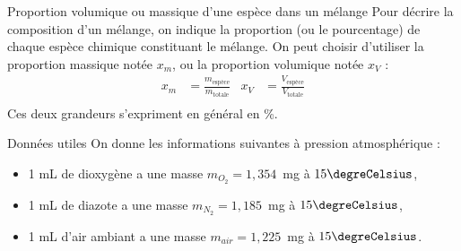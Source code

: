 \begin{doc}{Proportion volumique ou massique d’une espèce dans un mélange}
Pour décrire la composition d’un mélange, on indique la proportion (ou le pourcentage) de chaque espèce chimique constituant le mélange. On peut choisir d’utiliser la proportion massique notée $x_m$, ou la proportion volumique notée $x_V$ :
\begin{align*}
    x_m &= \frac{m_{\text{espèce}}}{m_{\text{totale}}} & x_V & = \frac{V_{\text{espèce}}}{V_{\text{totale}}}\\
\end{align*}
Ces deux grandeurs s'expriment en général en \%.
\end{doc}

\begin{doc}{Données utiles}
On donne les informations suivantes à pression atmosphérique :
\begin{itemize}
    \item 1 mL de dioxygène a une masse $m_{O_2}
=1,354$~mg à $15\degreCelsius$,
    \item 1 mL de diazote a une masse $m_{N_2}
=1,185$~mg à $15\degreCelsius$,
    \item 1 mL d’air ambiant a une masse $m_{air}=1,225$~mg à $15\degreCelsius$.
\end{itemize}
\end{doc}

\newpage


